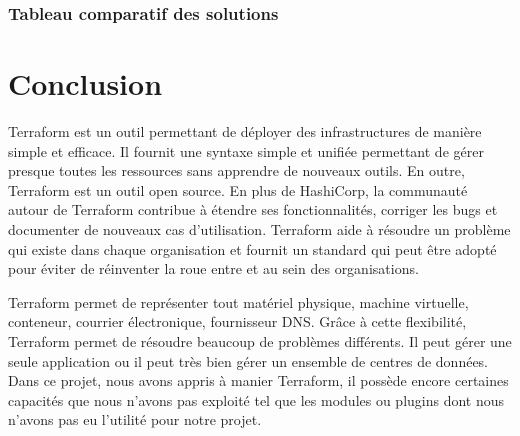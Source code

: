 \documentclass[]{article}
\begin{document}
\subsubsection{Tableau comparatif des solutions}
\newpage
\section{Conclusion}\label{conclusion}

Terraform est un outil permettant de déployer des
infrastructures de manière simple et efficace. Il fournit une syntaxe
simple et unifiée permettant de gérer presque toutes les ressources sans
apprendre de nouveaux outils. En outre, Terraform est un outil open
source. En plus de HashiCorp, la communauté autour de Terraform
contribue à étendre ses fonctionnalités, corriger les bugs et documenter
de nouveaux cas d'utilisation. Terraform aide à résoudre un problème qui
existe dans chaque organisation et fournit un standard qui peut être
adopté pour éviter de réinventer la roue entre et au sein des
organisations.

Terraform permet de représenter tout matériel physique, machine virtuelle, conteneur, courrier électronique, fournisseur DNS. Grâce à cette flexibilité, Terraform permet de résoudre beaucoup de problèmes différents. Il peut gérer une seule application ou il peut très bien gérer un ensemble de centres de données. Dans ce projet, nous avons appris à manier Terraform, il possède encore certaines capacités que nous n'avons pas exploité tel que les modules ou plugins dont nous n'avons pas eu l'utilité pour notre projet.
\end{document}
